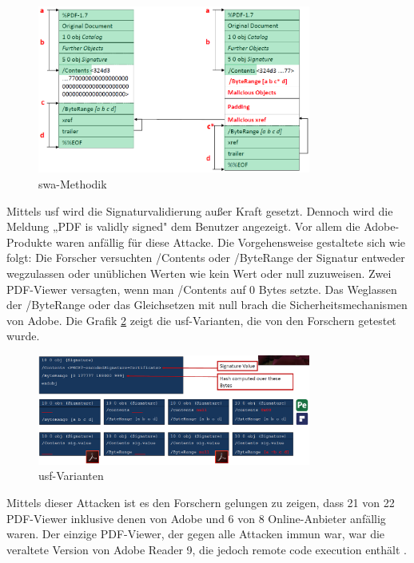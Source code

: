 \begin{figure}[!htbp]
	\centering
	\includegraphics[width=0.8\textwidth]{"images/sig_wrap_attack.png"}
	\caption{\gls{swa}-Methodik \cite{ccc-break-pdf-slides}}
	\label{fig:swa}
\end{figure}

Mittels \gls{usf} wird die Signaturvalidierung außer Kraft gesetzt. Dennoch wird die Meldung „PDF is validly signed" dem Benutzer angezeigt. Vor allem die Adobe-Produkte waren anfällig für diese Attacke. Die Vorgehensweise gestaltete sich wie folgt: Die Forscher versuchten /Contents oder /ByteRange der Signatur entweder wegzulassen oder unüblichen Werten wie kein Wert oder null zuzuweisen. Zwei PDF-Viewer versagten, wenn man /Contents auf 0 Bytes setzte. Das Weglassen der /ByteRange oder das Gleichsetzen mit null brach die Sicherheitsmechanismen von Adobe. Die Grafik \ref{fig:usf} zeigt die \gls{usf}-Varianten, die von den Forschern getestet wurde.
\par

\begin{figure}[!htbp]
	\centering
	\includegraphics[width=0.8\textwidth]{"images/univ_sig_forgery.png"}
	\caption{\gls{usf}-Varianten \cite{ccc-break-pdf-slides}}
	\label{fig:usf}
\end{figure}

Mittels dieser Attacken ist es den Forschern gelungen zu zeigen, dass 21 von 22 PDF-Viewer inklusive denen von Adobe und 6 von 8 Online-Anbieter anfällig waren. Der einzige PDF-Viewer, der gegen alle Attacken immun war, war die veraltete Version von Adobe Reader 9, die jedoch remote code execution enthält \cite{ccc-break-pdf}. 